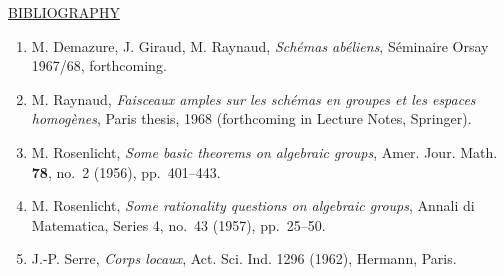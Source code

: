 \bigskip
\noindent\underline{BIBLIOGRAPHY}

\begin{enumerate}
\item[{[1]}] M. Demazure, J. Giraud, M. Raynaud,
  \emph{Sch\'emas ab\'eliens}, S\'eminaire Orsay 1967/68, forthcoming.
\item[{[2]}] M. Raynaud, \emph{Faisceaux amples sur les sch\'emas en groupes
  et les espaces homog\`enes}, Paris thesis, 1968 (forthcoming in Lecture
  Notes, Springer).
\item[{[3]}] M. Rosenlicht, \emph{Some basic theorems on algebraic groups},
  Amer. Jour. Math. \textbf{78}, no.~2 (1956), pp.~401--443.
\item[{[3bis]}] M. Rosenlicht, \emph{Some rationality questions on algebraic
  groups}, Annali di Matematica, Series 4, no.~43 (1957), pp.~25--50.
\item[{[4]}] J.-P. Serre, \emph{Corps locaux}, Act. Sci. Ind. 1296 (1962),
  Hermann, Paris.
\end{enumerate}
